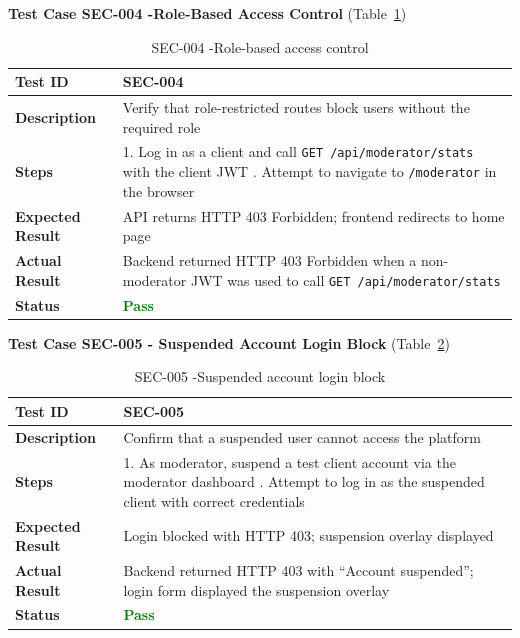 \textbf{Test Case SEC-004 -Role-Based Access Control} (Table~\ref{tab:sec004})
\begin{table}[H]
\caption{SEC-004 -Role-based access control}
\centering
\begin{tabular}{|l|p{10cm}|}
\hline
\textbf{Test ID} & SEC-004 \\
\hline
\textbf{Description} & Verify that role-restricted routes block users without the required role \\
\hline
\textbf{Steps} &
1. Log in as a client and call \texttt{GET /api/moderator/stats} with the client JWT \newline
2. Attempt to navigate to \texttt{/moderator} in the browser \\
\hline
\textbf{Expected Result} & API returns HTTP 403 Forbidden; frontend redirects to home page \\
\hline
\textbf{Actual Result} & Backend returned HTTP 403 Forbidden when a non-moderator JWT was used to call \texttt{GET /api/moderator/stats} \\
\hline
\textbf{Status} & \textcolor{green}{\textbf{Pass}} \\
\hline
\end{tabular}

\label{tab:sec004}
\end{table}
\newpage
\textbf{Test Case SEC-005 - Suspended Account Login Block} (Table~\ref{tab:sec005})
\begin{table}[H]
\caption{SEC-005 -Suspended account login block}
\centering
\begin{tabular}{|l|p{10cm}|}
\hline
\textbf{Test ID} & SEC-005 \\
\hline
\textbf{Description} & Confirm that a suspended user cannot access the platform \\
\hline
\textbf{Steps} &
1. As moderator, suspend a test client account via the moderator dashboard \newline
2. Attempt to log in as the suspended client with correct credentials \\
\hline
\textbf{Expected Result} & Login blocked with HTTP 403; suspension overlay displayed \\
\hline
\textbf{Actual Result} & Backend returned HTTP 403 with ``Account suspended''; login form displayed the suspension overlay \\
\hline
\textbf{Status} & \textcolor{green}{\textbf{Pass}} \\
\hline
\end{tabular}
\label{tab:sec005}
\end{table}

